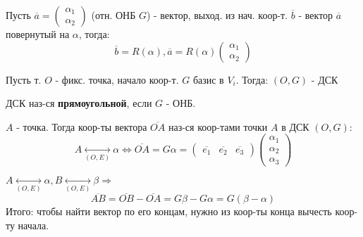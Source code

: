 \begin{task}
Пусть $\overline{a} = \begin{pmatrix}\alpha_1 \\ \alpha_2 \end{pmatrix}$ (отн. ОНБ $G$) - вектор, выход. из нач. коор-т. $\overline{b}$ - вектор $\overline{a}$ повернутый на $\alpha$, тогда:
\[
\overline{b} = R(\alpha), \overline{a} = R(\alpha) \begin{pmatrix}\alpha_1 \\ \alpha_2 \end{pmatrix}
\] 
\end{task}

\begin{definition}
Пусть т. $O$ - фикс. точка, начало коор-т. $G$ базис в $V_i$. Тогда:
    $(O, G)$ - ДСК
\end{definition}
\begin{definition}
    ДСК наз-ся \textbf{прямоугольной}, если $G$ - ОНБ.
\end{definition}
\begin{definition}
    $A$ - точка. Тогда коор-ты вектора $\overline{OA}$ наз-ся коор-тами точки $A$ в ДСК $(O, G)$:
    \[
        A \underset{(O, E)}{\longleftrightarrow} \alpha \iff \overline{OA} = G\alpha = \begin{pmatrix}\overline{e_1} & \overline{e_2} & \overline{e_3} \end{pmatrix} \begin{pmatrix}\alpha_1 \\\alpha_2 \\ \alpha_3 \end{pmatrix}
    \] 
\end{definition}
\begin{statement}
$A \underset{(O, E)}{\longleftrightarrow} \alpha, B \underset{(O, E)}{\longleftrightarrow} \beta \Rightarrow$
\[
\overline{AB} = \overline{OB} - \overline{OA} = G\beta - G\alpha = G(\beta - \alpha)
\] 
Итого: чтобы найти вектор по его концам, нужно из коор-ты конца вычесть коор-ту начала.
\end{statement}

